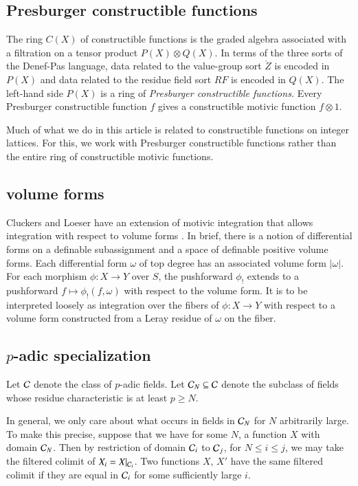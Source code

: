 \subsection{Presburger constructible functions}

The ring $C(X)$ of constructible functions is the graded algebra
associated with a filtration on a tensor product $P(X) \otimes Q(X)$.
In terms of the three sorts of the Denef-Pas language, data related to
the value-group sort $\ring{Z}$ is encoded in $P(X)$ and data related
to the residue field sort $RF$ is encoded in $Q(X)$.  The left-hand
side $P(X)$ is a ring of {\it Presburger constructible functions.}
Every Presburger constructible function $f$ gives a constructible
motivic function $f\otimes 1$.

Much of what we do in this article is related to constructible
functions on integer lattices.  For this, we work with Presburger
constructible functions rather than the entire ring of constructible
motivic functions.

\subsection{volume forms}

Cluckers and Loeser have an extension of motivic integration that
allows integration with respect to volume forms
\cite[\S8]{cluckers2008constructible}.  In brief, there is a notion of
differential forms on a definable subassignment and a space of
definable positive volume forms.  Each differential form $\omega$ of
top degree has an associated volume form $|\omega|$.  For each
morphism $\phi:X\to Y$ over $S$, the pushforward $\phi_!$ extends to a
pushforward $f \mapsto \phi_!(f,\omega)$ with respect to the volume
form.  It is to be interpreted loosely as integration over the fibers
of $\phi:X\to Y$ with respect to a volume form constructed from a
Leray residue of $\omega$ on the fiber.

\subsection{$p$-adic specialization}

Let $\mathcal C$ denote the class of $p$-adic fields.  Let $\mathcal C_N\subseteq \mathcal C$
denote the subclass of fields whose residue characteristic is at least
$p\ge N$.

In general, we only care about what occurs in fields in $\mathcal C_N$ for $N$
arbitrarily large.  To make this precise, suppose that we have for
some $N$, a function $X$ with domain $\mathcal C_N$.  Then by restriction of
domain $\mathcal C_i$ to $\mathcal C_{j}$, for $N\le i\le j$, we may take the filtered
colimit of $X_i=X|_{\mathcal C_i}$.  Two functions $X$, $X'$ have the same
filtered colimit if they are equal in $\mathcal C_i$ for some sufficiently
large $i$.

